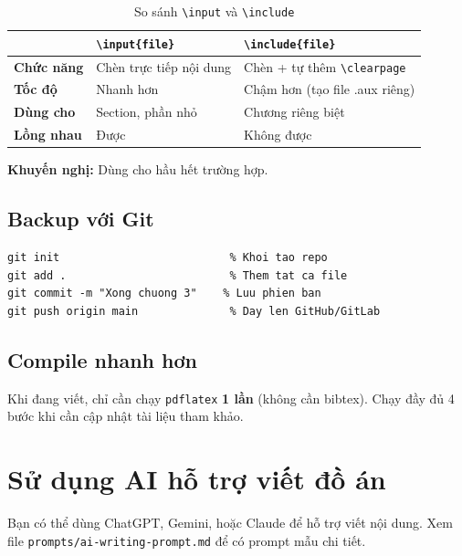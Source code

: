 \begin{table}[H]
\centering
\caption{So sánh \texttt{\textbackslash input} và \texttt{\textbackslash include}}
\label{tab:input-vs-include}
\begin{tabular}{lp{5.5cm}p{5.5cm}}
\toprule
 & \texttt{\textbackslash input\{file\}} & \texttt{\textbackslash include\{file\}} \\
\midrule
\textbf{Chức năng} & Chèn trực tiếp nội dung & Chèn + tự thêm \verb|\clearpage| \\
\textbf{Tốc độ} & Nhanh hơn & Chậm hơn (tạo file .aux riêng) \\
\textbf{Dùng cho} & Section, phần nhỏ & Chương riêng biệt \\
\textbf{Lồng nhau} & Được & Không được \\
\bottomrule
\end{tabular}
\end{table}

\textbf{Khuyến nghị:} Dùng \verb|| cho hầu hết trường hợp.

\subsection{Backup với Git}

\begin{lstlisting}[style=latexstyle, caption={Các lệnh Git cơ bản}]
git init                          % Khoi tao repo
git add .                         % Them tat ca file
git commit -m "Xong chuong 3"    % Luu phien ban
git push origin main              % Day len GitHub/GitLab
\end{lstlisting}

\subsection{Compile nhanh hơn}

Khi đang viết, chỉ cần chạy \texttt{pdflatex} \textbf{1 lần} (không cần bibtex). Chạy đầy đủ 4 bước khi cần cập nhật tài liệu tham khảo.

\section{Sử dụng AI hỗ trợ viết đồ án}

Bạn có thể dùng ChatGPT, Gemini, hoặc Claude để hỗ trợ viết nội dung. Xem file \texttt{prompts/ai-writing-prompt.md} để có prompt mẫu chi tiết.

